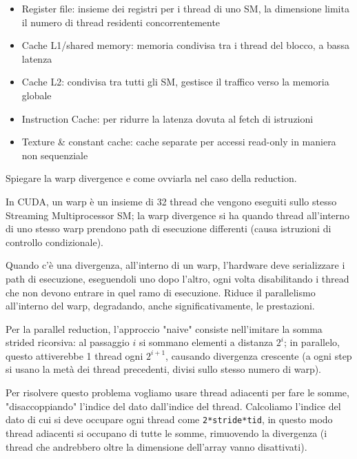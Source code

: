 \begin{questions}
\begin{solution}
\begin{itemize}
            \item Register file: insieme dei registri per i thread di uno SM, la dimensione limita il numero di thread residenti concorrentemente 
            
            \item Cache L1/shared memory: memoria condivisa tra i thread del blocco, a bassa latenza
            
            \item Cache L2: condivisa tra tutti gli SM, gestisce il traffico verso la memoria globale
            
            \item Instruction Cache: per ridurre la latenza dovuta al fetch di istruzioni
            
            \item Texture \& constant cache: cache separate per accessi read-only in maniera non sequenziale
        \end{itemize}
    \end{solution}
    
    \question Spiegare la warp divergence e come ovviarla nel caso della reduction.
    
    \begin{solution}
        In CUDA, un warp è un insieme di 32 thread che vengono eseguiti sullo stesso Streaming Multiprocessor SM; la warp divergence si ha quando thread all'interno di uno stesso warp prendono path di esecuzione differenti (causa istruzioni di controllo condizionale).
        
        Quando c'è una divergenza, all'interno di un warp, l'hardware deve serializzare i path di esecuzione, eseguendoli uno dopo l'altro, ogni volta disabilitando i thread che non devono entrare in quel ramo di esecuzione. Riduce il parallelismo all'interno del warp, degradando, anche significativamente, le prestazioni.
        
        Per la parallel reduction, l'approccio "naive" consiste nell'imitare la somma strided ricorsiva: al passaggio $i$ si sommano elementi a distanza $2^i$; in parallelo, questo attiverebbe 1 thread ogni $2^{i+1}$, causando divergenza crescente (a ogni step si usano la metà dei thread precedenti, divisi sullo stesso numero di warp).
        
        Per risolvere questo problema vogliamo usare thread adiacenti per fare le somme, "disaccoppiando" l'indice del dato dall'indice del thread. Calcoliamo l'indice del dato di cui si deve occupare ogni thread come \texttt{2*stride*tid}, in questo modo thread adiacenti si occupano di tutte le somme, rimuovendo la divergenza (i thread che andrebbero oltre la dimensione dell'array vanno disattivati).
        

\end{solution}
\end{questions}
